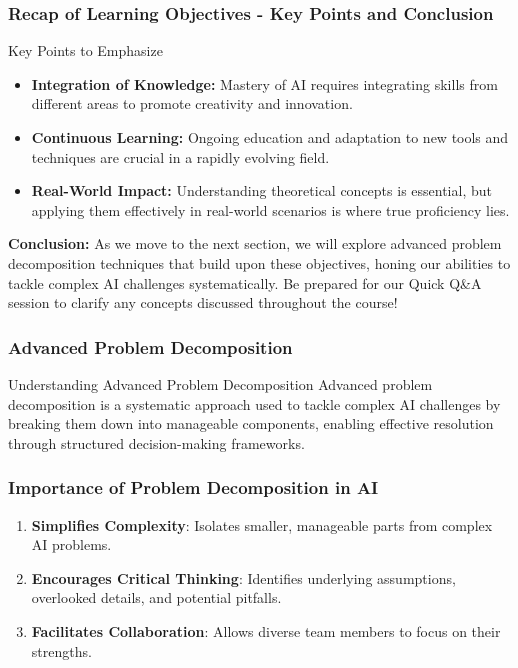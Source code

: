 \documentclass[aspectratio=169]{beamer}
\begin{document}
\begin{frame}[fragile]
    \frametitle{Recap of Learning Objectives - Key Points and Conclusion}
    \begin{block}{Key Points to Emphasize}
        \begin{itemize}
            \item \textbf{Integration of Knowledge:} Mastery of AI requires integrating skills from different areas to promote creativity and innovation.
            \item \textbf{Continuous Learning:} Ongoing education and adaptation to new tools and techniques are crucial in a rapidly evolving field.
            \item \textbf{Real-World Impact:} Understanding theoretical concepts is essential, but applying them effectively in real-world scenarios is where true proficiency lies.
        \end{itemize}
    \end{block}

    \textbf{Conclusion:} As we move to the next section, we will explore advanced problem decomposition techniques that build upon these objectives, honing our abilities to tackle complex AI challenges systematically. Be prepared for our Quick Q\&A session to clarify any concepts discussed throughout the course!
\end{frame}

\begin{frame}[fragile]
    \frametitle{Advanced Problem Decomposition}
    \begin{block}{Understanding Advanced Problem Decomposition}
        Advanced problem decomposition is a systematic approach used to tackle complex AI challenges by breaking them down into manageable components, enabling effective resolution through structured decision-making frameworks.
    \end{block}
\end{frame}

\begin{frame}[fragile]
    \frametitle{Importance of Problem Decomposition in AI}
    \begin{enumerate}
        \item \textbf{Simplifies Complexity}: Isolates smaller, manageable parts from complex AI problems.
        \item \textbf{Encourages Critical Thinking}: Identifies underlying assumptions, overlooked details, and potential pitfalls.
        \item \textbf{Facilitates Collaboration}: Allows diverse team members to focus on their strengths.
    \end{enumerate}
\end{frame}
\end{document}

